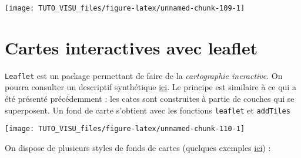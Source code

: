 \documentclass[]{book}
\newenvironment{Shaded}{\begin{snugshade}}{\end{snugshade}}
\newcommand{\DataTypeTok}[1]{\textcolor[rgb]{0.13,0.29,0.53}{#1}}
\newcommand{\KeywordTok}[1]{\textcolor[rgb]{0.13,0.29,0.53}{\textbf{#1}}}
\newcommand{\NormalTok}[1]{#1}
\newcommand{\OperatorTok}[1]{\textcolor[rgb]{0.81,0.36,0.00}{\textbf{#1}}}
\newcommand{\StringTok}[1]{\textcolor[rgb]{0.31,0.60,0.02}{#1}}
\theoremstyle{definition}
\theoremstyle{definition}
\theoremstyle{definition}
\theoremstyle{remark}
\begin{document}
\begin{Shaded}
\end{Shaded}

\begin{center}\texttt{[image: TUTO\_VISU\_files/figure-latex/unnamed-chunk-109-1]} \end{center}

\hypertarget{cartes-interactives-avec-leaflet}{%
\section{Cartes interactives avec leaflet}\label{cartes-interactives-avec-leaflet}}

\texttt{Leaflet} est un package permettant de faire de la \emph{cartographie ineractive}. On pourra consulter un descriptif synthétique \href{https://rstudio.github.io/leaflet/}{ici}. Le principe est similaire à ce qui a été présenté précédemment : les cates sont construites à partie de couches qui se superposent. Un fond de carte s'obtient avec les fonctions \texttt{leaflet} et \texttt{addTiles}

\begin{Shaded}
\end{Shaded}

\begin{center}\texttt{[image: TUTO\_VISU\_files/figure-latex/unnamed-chunk-110-1]} \end{center}

On dispose de plusieurs styles de fonds de cartes (quelques exemples \href{http://leaflet-extras.github.io/leaflet-providers/preview/}{ici}) :
\end{document}
